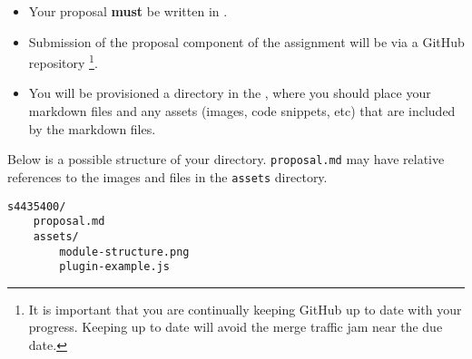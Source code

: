 \documentclass{csse4400}
\begin{document}
\begin{itemize}
    \item Your proposal \textbf{must} be written in .
    \item Submission of the proposal component of the assignment will be via a GitHub repository%
             \footnote{It is important that you are continually keeping GitHub up to date with your progress.
              Keeping up to date will avoid the merge traffic jam near the due date.}.
    \item You will be provisioned a directory in the ,
             where you should place your markdown files and any assets (images, code snippets, etc) that are included by the markdown files.
\end{itemize}

\noindent
Below is a possible structure of your directory.
\texttt{proposal.md} may have relative references to the images and files in the \texttt{assets} directory.

\begin{verbatim}
s4435400/
    proposal.md
    assets/
        module-structure.png
        plugin-example.js
\end{verbatim}
\end{document}
